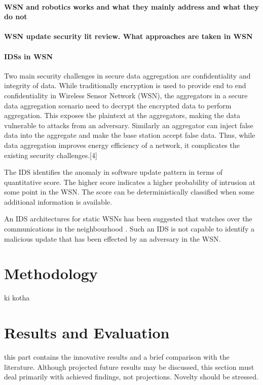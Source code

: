 \documentclass[conference,final]{IEEEtran}
\begin{document}
\paragraph{WSN and robotics works and what they mainly address and what they do not}
\paragraph{WSN update security lit review. What approaches are taken in WSN}
\paragraph{IDSs in WSN}

Two main security challenges in secure data aggregation are confidentiality and integrity of data. While traditionally encryption is used to provide end to end confidentiality in Wireless Sensor Network (WSN), the aggregators in a secure data aggregation scenario need to decrypt the encrypted data to perform aggregation. This exposes the plaintext at the aggregators, making the data vulnerable to attacks from an adversary. Similarly an aggregator can inject false data into the aggregate and make the base station accept false data. Thus, while data aggregation improves energy efficiency of a network, it complicates the existing security challenges.[4]

The IDS identifies the anomaly in software update pattern in terms of quantitative score. The higher score indicates a higher probability of intrusion at some point in the WSN. The score can be deterministically classified when some additional information is available.

An
IDS architectures for static WSNs has been suggested that
watches over the communications in the neighbourhood .
Such an IDS is not capable to identify a malicious update that
has been effected by an adversary in the WSN.

\section{Methodology}
\label{sec:meth}



ki kotha

\section{Results and Evaluation}
\label{sec:eval}
this part contains the innovative results and a brief comparison with the literature. Although projected 
future results may be discussed, this section must deal primarily with achieved findings, not projections. Novelty 
should be stressed.
\end{document}

